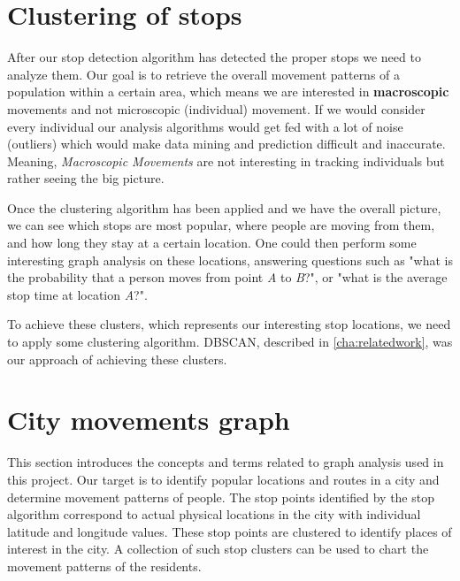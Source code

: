 \section{Clustering of stops}

After our stop detection algorithm has detected the proper stops we need to analyze them. Our goal is to retrieve the overall movement patterns of a population within a certain area, which means we are interested in \textbf{macroscopic} movements and not microscopic (individual) movement. If we would consider every individual our analysis algorithms would get fed with a lot of noise (outliers) which would make data mining and prediction difficult and inaccurate. Meaning, \textit{Macroscopic Movements} are not interesting in tracking individuals but rather seeing the big picture.

 Once the clustering algorithm has been applied and we have the overall picture, we can see which stops are most popular, where people are moving from them, and how long they stay at a certain location. One could then perform some interesting graph analysis on these locations, answering questions such as "what is the probability that a person moves from point \textit{A} to \textit{B}?", or "what is the average stop time at location \textit{A}?". 
 
 To achieve these clusters, which represents our interesting stop locations, we need to apply some clustering algorithm. DBSCAN, described in \autoref{cha:relatedwork}, was our approach of achieving these clusters.  

\FloatBarrier
\section{City movements graph}
\label{cha:movementsGraph}
This section introduces the concepts and terms related to graph analysis used in this project. Our target is to identify popular locations and routes in a city and determine movement patterns of people. The stop points identified by the stop algorithm correspond to actual physical locations in the city with individual latitude and longitude values. These stop points are clustered to identify places of interest in the city. A collection of such stop clusters can be used to chart the movement patterns of the residents.

